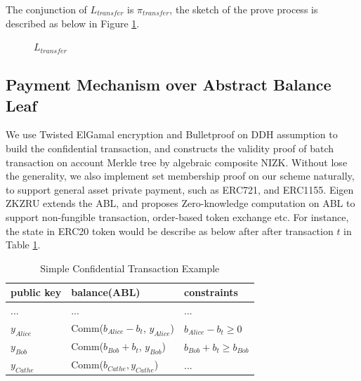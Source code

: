 \documentclass{article}
\begin{document}
The conjunction of $L_{transfer}$ is $\pi_{transfer}$, the sketch of the prove process is described as below in Figure \ref{fig:pi_transfer}.
\begin{figure}[H]
    \centering
    \caption{${L_{transfer}}$}
    \label{fig:pi_transfer}
\end{figure}

\subsection{Payment Mechanism over Abstract Balance Leaf} \label{section:pay-abl}

We use Twisted ElGamal encryption \cite{chen2020pgc} and Bulletproof \cite{bunz2018bulletproofs} on DDH assumption to build the confidential transaction, and constructs the validity proof of batch transaction on account Merkle tree by algebraic composite NIZK. Without lose the generality, we also implement set membership proof on our scheme naturally, to support general asset private payment, such as ERC721, and ERC1155. Eigen ZKZRU extends the ABL, and proposes Zero-knowledge computation on ABL to support non-fungible transaction, order-based token exchange etc. For instance, the state in ERC20 token would be describe as below after after transaction $t$ in Table \ref{tab:transfer}. 

\begin{table}
\centering
\begin{tabular}{l|l|l}
public key & balance(ABL) & constraints \\
\hline
... & ... & ...  \\
\hline
$y_{Alice}$  & Comm($b_{Alice} - b_t$, $y_{Alice}$) & $b_{Alice} - b_t \ge 0$ \\
\hline
$y_{Bob}$  & Comm($b_{Bob} + b_t$, $y_{Bob}$) & $b_{Bob} + b_t \ge b_{Bob} $  \\
\hline
$y_{Cathe}$  & Comm($b_{Cathe}, y_{Cathe}$) & ...   \\
\end{tabular}
\caption{\label{tab:transfer}Simple Confidential Transaction Example}
\end{table}
\end{document}
